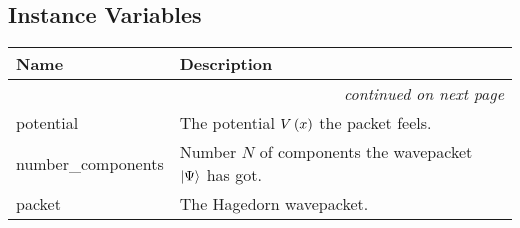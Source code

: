 
  \subsection{Instance Variables}

    \vspace{-1cm}
\hspace{\varindent}\begin{longtable}{|p{\varnamewidth}|p{\vardescrwidth}|l}
\cline{1-2}
\cline{1-2} \centering \textbf{Name} & \centering \textbf{Description}& \\
\cline{1-2}
\endhead\cline{1-2}\multicolumn{3}{r}{\small\textit{continued on next page}}\\\endfoot\cline{1-2}
\endlastfoot\raggedright p\-o\-t\-e\-n\-t\-i\-a\-l\- & The potential $V\left( x \right)$ the packet feels.&\\
\cline{1-2}
\raggedright number\_components & Number $N$ of components the wavepacket
          $\Ket{\Psi}$ has got.&\\
\cline{1-2}
\raggedright p\-a\-c\-k\-e\-t\- & The Hagedorn wavepacket.&\\
\cline{1-2}
\end{longtable}


